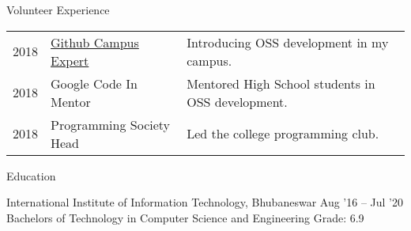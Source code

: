 \documentclass{resume} %
\begin{document}

\begin{rSection}{Volunteer Experience}
  \begin{tabular}{rll}
2018	     & {\href{http://bit.ly/2OsNuqI}{Github Campus Expert}}  & Introducing OSS development in my campus.\\
2018	     & Google Code In Mentor  & Mentored High School students in OSS development.\\
2018	     & Programming Society Head  & Led the college programming club.\\
\end{tabular}
\end{rSection}



\begin{rSection}{Education}
  \begin{rEducationSection}{International Institute of Information Technology, Bhubaneswar}
                           {Aug '16 -- Jul '20}
                           {Bachelors of Technology in Computer Science and Engineering \space \space \space \space \space\space \space \space\space \space \space\space \space \space\space \space \space\space \space \space\space Grade: 6.9}
  \end{rEducationSection}
\end{rSection}
\end{document}
